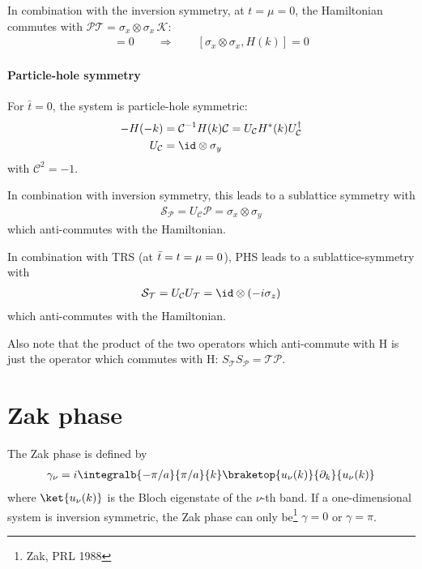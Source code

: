 In combination with the inversion symmetry, at $t=\mu=0$, the Hamiltonian commutes with $\mathcal{P}\mathcal{T} = \sigma_x \otimes \sigma_x \, \mathcal{K}$:
\begin{align}
    [\mathcal{P}\mathcal{T}, H(k)] = 0\qquad \Rightarrow \qquad [\sigma_x \otimes \sigma_x, H(k)]= 0
\end{align}

\paragraph{Particle-hole symmetry}
For $\bar{t}=0$, the system is particle-hole symmetric:
\begin{align}
    -H(-k) &= \mathcal{C}^{-1} H(k) \mathcal{C} =  U_\mathcal{C} H^*(k) U_\mathcal{C}^\dagger \\
    U_\mathcal{C} &= \id \otimes \sigma_y
\end{align}
with $\mathcal{C}^2=-1$.

In combination with inversion symmetry, this leads to a sublattice symmetry with
\begin{align}
    \mathcal{S}_\mathcal{P} = U_\mathcal{C} \mathcal{P} = \sigma_x \otimes \sigma_y
\end{align}
which anti-commutes with the Hamiltonian.

In combination with TRS (at $\bar{t}=t=\mu=0$), PHS leads to a sublattice-symmetry with
\begin{align}
    \mathcal{S}_\mathcal{T} = U_\mathcal{C}U_\mathcal{T} =  \id\otimes (-i\sigma_z)
\end{align}
which anti-commutes with the Hamiltonian.

Also note that the product of the two operators which anti-commute with H is just the operator which commutes with H: $S_\mathcal{T}S_\mathcal{P} = \mathcal{T}\mathcal{P}$.

\section{Zak phase}
The Zak phase is defined by
\begin{align}
    \gamma_\nu = i\integralb{-\pi/a}{\pi/a}{k} \braketop{u_\nu(k)}{\partial_k}{u_\nu(k)}
\end{align}
where $\ket{u_\nu(k)}$ is the Bloch eigenstate of the $\nu$-th band.
If a one-dimensional system is inversion symmetric, the Zak phase can only be\footnote{Zak, PRL 1988} $\gamma=0$ or $\gamma=\pi$.

